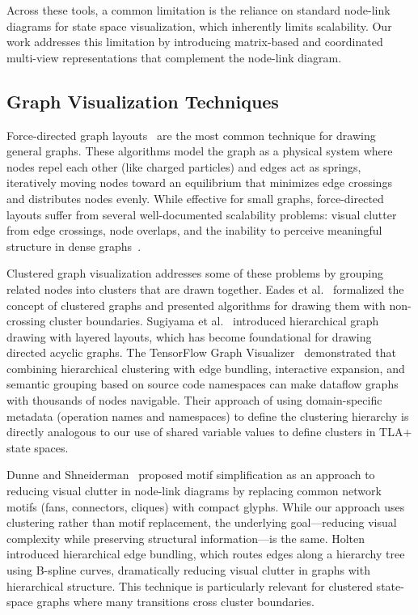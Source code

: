 \documentclass[conference]{IEEEtran}
\begin{document}
Across these tools, a common limitation is the reliance on standard node-link diagrams for state space visualization, which inherently limits scalability. Our work addresses this limitation by introducing matrix-based and coordinated multi-view representations that complement the node-link diagram.

\subsection{Graph Visualization Techniques}

Force-directed graph layouts~\cite{harel1988visual} are the most common technique for drawing general graphs. These algorithms model the graph as a physical system where nodes repel each other (like charged particles) and edges act as springs, iteratively moving nodes toward an equilibrium that minimizes edge crossings and distributes nodes evenly. While effective for small graphs, force-directed layouts suffer from several well-documented scalability problems: visual clutter from edge crossings, node overlaps, and the inability to perceive meaningful structure in dense graphs~\cite{herman2000graph}.

Clustered graph visualization addresses some of these problems by grouping related nodes into clusters that are drawn together. Eades et al.~\cite{eades1996hierarchical} formalized the concept of clustered graphs and presented algorithms for drawing them with non-crossing cluster boundaries. Sugiyama et al.~\cite{sugiyama1981hierarchical} introduced hierarchical graph drawing with layered layouts, which has become foundational for drawing directed acyclic graphs. The TensorFlow Graph Visualizer~\cite{wongsuphasawat2018tensorflow} demonstrated that combining hierarchical clustering with edge bundling, interactive expansion, and semantic grouping based on source code namespaces can make dataflow graphs with thousands of nodes navigable. Their approach of using domain-specific metadata (operation names and namespaces) to define the clustering hierarchy is directly analogous to our use of shared variable values to define clusters in TLA+ state spaces.

Dunne and Shneiderman~\cite{dunne2013motif} proposed motif simplification as an approach to reducing visual clutter in node-link diagrams by replacing common network motifs (fans, connectors, cliques) with compact glyphs. While our approach uses clustering rather than motif replacement, the underlying goal---reducing visual complexity while preserving structural information---is the same. Holten~\cite{holten2006hierarchical} introduced hierarchical edge bundling, which routes edges along a hierarchy tree using B-spline curves, dramatically reducing visual clutter in graphs with hierarchical structure. This technique is particularly relevant for clustered state-space graphs where many transitions cross cluster boundaries.
\end{document}

